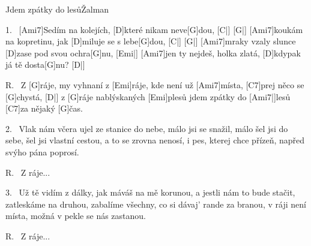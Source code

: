 \begin{song}{Jdem zpátky do lesů}{Žalman}

\begin{xverse}{1.~}
[Ami7]Sedím na kolejích, [D]které nikam neve[G]dou, [C|]{} [G|]{}
[Ami7]koukám na kopretinu, jak [D]miluje se s lebe[G]dou, [C|]{} [G|]{}
[Ami7]mraky vzaly slunce [D]zase pod svou ochra[G]nu, [Emi|]{}
[Ami7]jen ty nejdeš, holka zlatá, [D]kdypak já tě dosta[G]nu? [D|]{}
\end{xverse}

\begin{xverse}{R.~}
Z [G]ráje, my vyhnaní z [Emi]ráje,
kde není už [Ami7]místa, [C7]prej něco se [G]chystá, [D|]{}
z [G]ráje nablýskaných [Emi]plesů
jdem zpátky do [Ami7|]{lesů} [C7]{}za nějaký [G]{}čas.
\end{xverse}

\begin{xverse}{2.~}
Vlak nám včera ujel ze stanice do nebe,
málo jsi se snažil, málo šel jsi do sebe,
šel jsi vlastní cestou, a to se zrovna nenosí,
i pes, kterej chce přízeň, napřed svýho pána poprosí.
\end{xverse}

\begin{xverse}{R.~}
Z ráje...
\end{xverse}

\begin{xverse}{3.~}
Už tě vidím z dálky, jak máváš na mě korunou,
a jestli nám to bude stačit, zatleskáme na druhou,
zabalíme všechny, co si dávaj' rande za branou,
v ráji není místa, možná v pekle se nás zastanou.
\end{xverse}

\begin{xverse}{R.~}
Z ráje...
\end{xverse}

\end{song}

